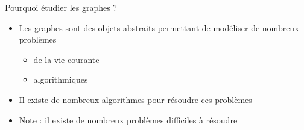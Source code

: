 
\begin{frame}{Pourquoi étudier les graphes ?}
    \begin{itemize}
        \item Les graphes sont des objets abstraits permettant de modéliser de nombreux problèmes
        \begin{itemize}
            \item de la vie courante 
            \item algorithmiques 
        \end{itemize}
        \item Il existe de nombreux algorithmes pour résoudre ces problèmes
        \item Note : il existe de nombreux problèmes difficiles à résoudre 
    \end{itemize}
\end{frame}